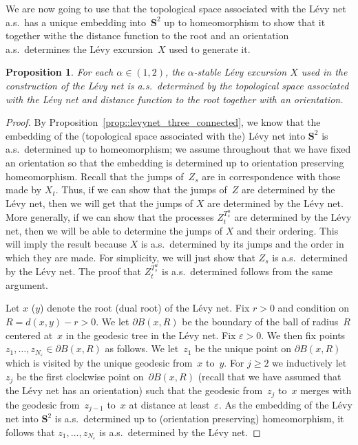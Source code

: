 \documentclass[10pt]{amsart}
\let\epsilon\varepsilon
\theoremstyle{plain}
\numberwithin{theorem}{section}
\newtheorem{proposition}[theorem]{Proposition}
\theoremstyle{definition}
\renewcommand{\S}{{\mathbf S}}
\begin{document}
We are now going to use that the topological space associated with the Lévy net a.s.\ has a unique embedding into~$\S^2$ up to homeomorphism to show that it together withe the distance function to the root and an orientation a.s.\ determines the Lévy excursion~$X$ used to generate it.

\begin{proposition}
\label{prop::levynet_structure_determined}
For each $\alpha \in (1,2)$, the $\alpha$-stable Lévy excursion $X$ used in the construction of the Lévy net is a.s.\ determined by the topological space associated with the Lévy net and distance function to the root together with an orientation.
\end{proposition}
\begin{proof}
By Proposition~\ref{prop::levynet_three_connected}, we know that the embedding of the (topological space associated with the) Lévy net into $\S^2$ is a.s.\ determined up to homeomorphism; we assume throughout that we have fixed an orientation so that the embedding is determined up to orientation preserving homeomorphism. Recall that the jumps of~$Z_s$ are in correspondence with those made by $X_t$. Thus, if we can show that the jumps of~$Z$ are determined by the Lévy net, then we will get that the jumps of $X$ are determined by the Lévy net. More generally, if we can show that the processes $Z_t^{T_s^u}$ are determined by the Lévy net, then we will be able to determine the jumps of $X$ and their ordering. This will imply the result because $X$ is a.s.\ determined by its jumps and the order in which they are made. For simplicity, we will just show that $Z_s$ is a.s.\ determined by the Lévy net. The proof that $Z_t^{T_s^u}$ is a.s.\ determined follows from the same argument.

Let $x$ (\resp $y$) denote the root (\resp dual root) of the Lévy net. Fix $r > 0$ and condition on $R = d(x,y) -r > 0$. We let $\partial B(x,R)$ be the boundary of the ball of radius~$R$ centered at~$x$ in the geodesic tree in the Lévy net. Fix $\epsilon > 0$. We then fix points $z_1,\ldots,z_{N_\epsilon} \in \partial B(x,R)$ as follows. We let~$z_1$ be the unique point on $\partial B(x,R)$ which is visited by the unique geodesic from~$x$ to~$y$. For $j \geq 2$ we inductively let~$z_j$ be the first clockwise point on~$\partial B(x,R)$ (recall that we have assumed that the Lévy net has an orientation) such that the geodesic from~$z_j$ to~$x$ merges with the geodesic from~$z_{j-1}$ to~$x$ at distance at least~$\epsilon$. As the embedding of the Lévy net into $\S^2$ is a.s.\ determined up to (orientation preserving) homeomorphism, it follows that $z_1,\ldots,z_{N_\epsilon}$ is a.s.\ determined by the Lévy net.


\end{proof}
\end{document}
